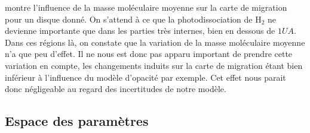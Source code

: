  montre l'influence de la masse moléculaire moyenne sur la carte de migration pour un disque
donné. On s'attend à ce que la photodissociation de $\mathrm{H_2}$ ne devienne importante que dans les parties très internes,
bien en dessous de $1\unit{UA}$. Dans ces régions là, on constate que la variation de la masse moléculaire moyenne n'a que peu
d'effet. Il ne nous est donc pas apparu important de prendre cette variation en compte, les changements induits sur la carte de
migration étant bien inférieur à l'influence du modèle d'opacité par exemple. Cet effet nous parait donc négligeable au regard
des incertitudes de notre modèle.

\subsection{Espace des paramètres}

